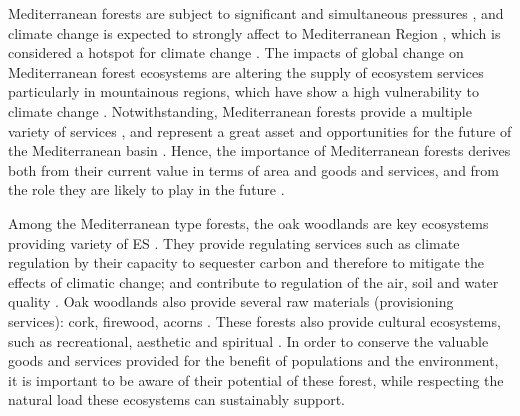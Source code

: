 Mediterranean forests are subject to significant and simultaneous pressures \autocites{FAOPlanBleu2018StateMediterranean, DoblasMirandaetal2017ReviewCombination}, and climate change is expected to strongly affect to Mediterranean Region \autocite{GiorgiLionello2008ClimateChange, Penuelasetal2017ImpactsGlobal,Crameretal2018ClimateChange,Crameretal2020ClimateEnvironmental}, which is considered a hotspot for climate change \autocite{Giorgi2006ClimateChange}. The impacts of global change on Mediterranean forest ecosystems are altering the supply of ecosystem services \autocite{Lindneretal2010ClimateChange,Lindneretal2014ClimateChange,NoceSantini2018MediterraneanForest,Penuelasetal2017ImpactsGlobal,SerradaHierroetal2011ImpactosVulnerabilidad} particularly in mountainous regions, which have show a high vulnerability to climate change \autocite{Schroteretal2005EcosystemService}. Notwithstanding, Mediterranean forests provide a multiple variety of services \autocite{NoceSantini2018MediterraneanForest}, and represent a great asset and opportunities for the future of the Mediterranean basin \autocite{Gauquelinetal2018MediterraneanForests, NoceSantini2018MediterraneanForest}. Hence, the importance of Mediterranean forests derives both from their current value in terms of area and goods and services, and from the role they are likely to play in the future \autocites{FAOPlanBleu2018StateMediterranean}.

Among the Mediterranean type forests, the oak woodlands are key ecosystems providing variety of ES \autocite{Maranonetal2020IberianOaks}. They provide regulating services such as climate regulation by their capacity to sequester carbon and therefore to mitigate the effects of climatic change; and contribute to regulation of the air, soil and water quality \autocite{Maranonetal2012EstadoTendencia}. Oak woodlands also provide several raw materials (provisioning services): cork, firewood, acorns \autocite{Bugalhoetal2011MediterraneanCork}. These forests also provide cultural ecosystems, such as recreational, aesthetic and spiritual \autocite{Lofetal2016ManagementOak}. In order to conserve the valuable goods and services provided for the benefit of populations and the environment, it is important to be aware of their potential of these forest, while respecting the natural load these ecosystems can sustainably support. 

